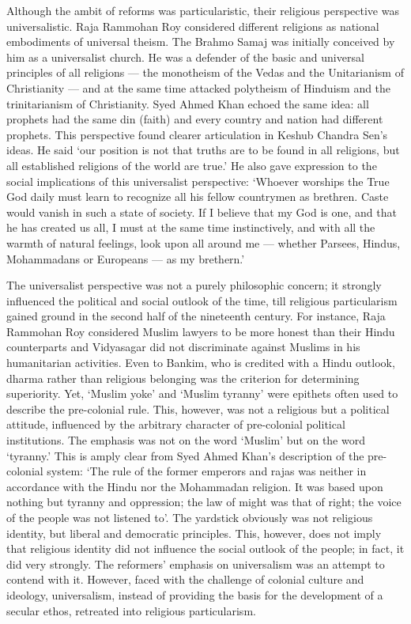 Although the ambit of reforms was particularistic, their religious perspective was universalistic. Raja Rammohan Roy considered different religions as national embodiments of universal theism. The Brahmo Samaj was initially conceived by him as a universalist church. He was a defender of the basic and universal principles of all religions — the monotheism of the Vedas and the Unitarianism of Christianity — and at the same time attacked polytheism of Hinduism and the trinitarianism of Christianity. Syed Ahmed Khan echoed the same idea: all prophets had the same din (faith) and every country and nation had different prophets. This perspective found clearer articulation in Keshub Chandra Sen's ideas. He said `our position is not that truths are to be found in all religions, but all established religions of the world are true.' He also gave expression to the social implications of this universalist perspective: `Whoever worships the True God daily must learn to recognize all his fellow countrymen as brethren. Caste would vanish in such a state of society. If I believe that my God is one, and that he has created us all, I must at the same time instinctively, and with all the warmth of natural feelings, look upon all around me — whether Parsees, Hindus, Mohammadans or Europeans — as my brethern.'

The universalist perspective was not a purely philosophic concern; it strongly influenced the political and social outlook of the time, till religious particularism gained ground in the second half of the nineteenth century. For instance, Raja Rammohan Roy considered Muslim lawyers to be more honest than their Hindu counterparts and Vidyasagar did not discriminate against Muslims in his humanitarian activities. Even to Bankim, who is credited with a Hindu outlook, dharma rather than religious belonging was the criterion for determining superiority. Yet, `Muslim yoke' and `Muslim tyranny' were epithets often used to describe the pre-colonial rule. This, however, was not a religious but a political attitude, influenced by the arbitrary character of pre-colonial political institutions. The emphasis was not on the word `Muslim' but on the word `tyranny.' This is amply clear from Syed Ahmed Khan's description of the pre-colonial system: `The rule of the former emperors and rajas was neither in accordance with the Hindu nor the Mohammadan religion. It was based upon nothing but tyranny and oppression; the law of might was that of right; the voice of the people was not listened to'. The yardstick obviously was not religious identity, but liberal and democratic principles. This, however, does not imply that religious identity did not influence the social outlook of the people; in fact, it did very strongly. The reformers' emphasis on universalism was an attempt to contend with it. However, faced with the challenge of colonial culture and ideology, universalism, instead of providing the basis for the development of a secular ethos, retreated into religious particularism.

